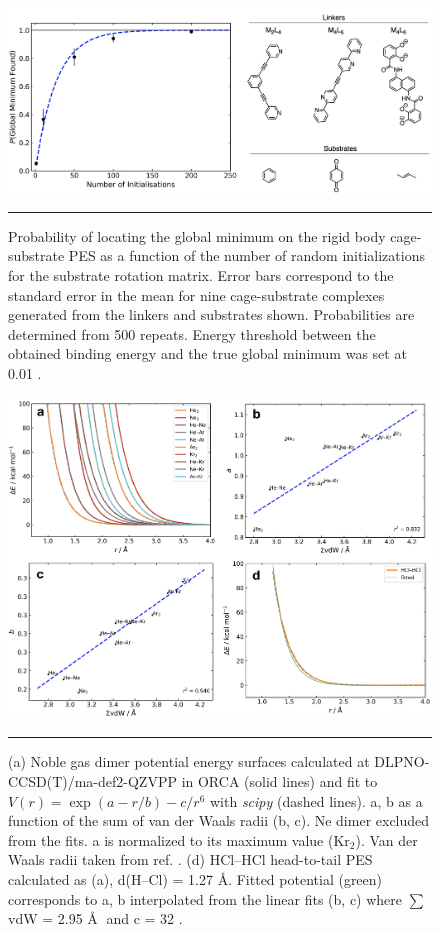 \documentclass[../../main.tex]{subfiles}
\begin{document}
\begin{figure}[h!]
	\vspace{0.4cm}
	\centering
	\includegraphics[width=\textwidth]{3/cgbind/figs/figS2}
	\vspace{0.2cm}
	\hrule
	\caption{Probability of locating the global minimum on the rigid body cage-substrate PES as a function of the number of random initializations for the substrate rotation matrix. Error bars correspond to the standard error in the mean for nine cage-substrate complexes generated from the linkers and substrates shown. Probabilities are determined from 500 repeats. Energy threshold between the obtained binding energy and the true global minimum was set at 0.01 \kcal.}
	\label{fig::si_cg_2}
\end{figure}



\begin{figure}[h!]
	\vspace{0.4cm}
	\centering
	 \includegraphics[width=\textwidth]{3/cgbind/figs/figS3}
	\vspace{0.2cm}
	\hrule
	\caption{(a) Noble gas dimer potential energy surfaces calculated at DLPNO-CCSD(T)/ma-def2-QZVPP in ORCA (solid lines) and fit to $V(r) = \exp(a-r/b) - c/r^6$ with \emph{scipy} (dashed lines). a, b as a function of the sum of van der Waals radii (b, c). Ne dimer excluded from the fits. a is normalized to its maximum value (Kr${}_2$). Van der Waals radii taken from ref. \cite{Mantina2009}. (d) HCl–HCl head-to-tail PES calculated as (a), d(H–Cl) = 1.27 \AA. Fitted potential (green) corresponds to a, b interpolated from the linear fits (b, c) where $\sum$vdW = 2.95 \AA$\;$ and c = 32 \kcal.}
	\label{fig::si_cg_3}
\end{figure}
\end{document}
